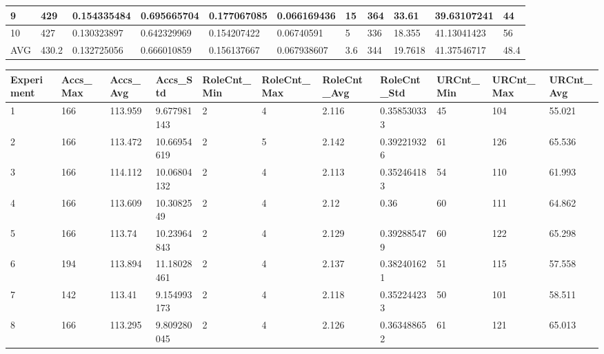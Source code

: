 \begin{table}[H]
\begin{adjustbox}{max width=380pt,keepaspectratio,angle=90}
\begin{tabular}{|l|l|l|l|l|l|l|l|l|l|l|}
						9          & 429   & 0.154335484  & 0.695665704  & 0.177067085  & 0.066169436  & 15        & 364       & 33.61     & 39.63107241 & 44        \\ \hline
						10         & 427   & 0.130323897  & 0.642329969  & 0.154207422  & 0.06740591   & 5         & 336       & 18.355    & 41.13041423 & 56        \\ \hline\hline
						AVG        & 430.2 & 0.132725056  & 0.666010859  & 0.156137667  & 0.067938607  & 3.6       & 344       & 19.7618   & 41.37546717 & 48.4      \\ \hline
					\end{tabular}
				\end{adjustbox}
				\begin{adjustbox}{max width=380pt,keepaspectratio,angle=90}
					\begin{tabular}{|l|l|l|l|l|l|l|l|l|l|l|}
						\rowcolor[HTML]{EFEFEF} 
						\hline
						Experiment & Accs\_Max & Accs\_Avg & Accs\_Std   & RoleCnt\_Min & RoleCnt\_Max & RoleCnt\_Avg & RoleCnt\_Std & URCnt\_Min & URCnt\_Max & URCnt\_Avg \\ \hline
						1          & 166       & 113.959   & 9.677981143 & 2            & 4            & 2.116        & 0.358530333  & 45         & 104        & 55.021     \\ \hline
						2          & 166       & 113.472   & 10.66954619 & 2            & 5            & 2.142        & 0.392219326  & 61         & 126        & 65.536     \\ \hline
						3          & 166       & 114.112   & 10.06804132 & 2            & 4            & 2.113        & 0.352464183  & 54         & 110        & 61.993     \\ \hline
						4          & 166       & 113.609   & 10.3082549  & 2            & 4            & 2.12         & 0.36         & 60         & 111        & 64.862     \\ \hline
						5          & 166       & 113.74    & 10.23964843 & 2            & 4            & 2.129        & 0.392885479  & 60         & 122        & 65.298     \\ \hline
						6          & 194       & 113.894   & 11.18028461 & 2            & 4            & 2.137        & 0.382401621  & 51         & 115        & 57.558     \\ \hline
						7          & 142       & 113.41    & 9.154993173 & 2            & 4            & 2.118        & 0.352244233  & 50         & 101        & 58.511     \\ \hline
						8          & 166       & 113.295   & 9.809280045 & 2            & 4            & 2.126        & 0.363488652  & 61         & 121        & 65.013     \\ \hline

\end{tabular}
\end{adjustbox}
\end{table}
